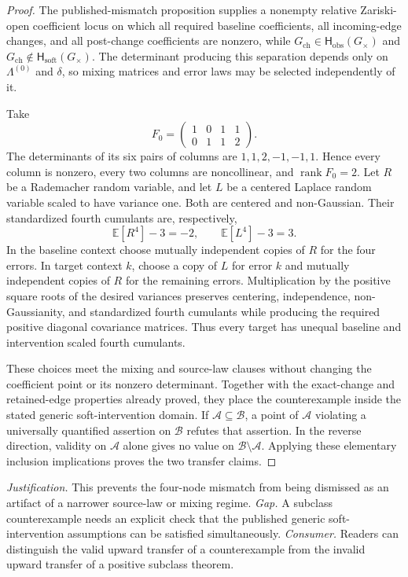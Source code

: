 \documentclass{article}
\begin{document}
\begin{proof}
The published-mismatch proposition supplies a nonempty relative Zariski-open coefficient locus on which all required baseline coefficients, all incoming-edge changes, and all post-change coefficients are nonzero, while \(G_{\mathrm{ch}}\in\mathsf H_{\mathrm{obs}}(G_\times)\) and \(G_{\mathrm{ch}}\notin\mathsf H_{\mathrm{soft}}(G_\times)\).  The determinant producing this separation depends only on \(\Lambda^{(0)}\) and \(\delta\), so mixing matrices and error laws may be selected independently of it.

Take
\[
 F_0=\begin{pmatrix}1&0&1&1\\0&1&1&2\end{pmatrix}.
\]
The determinants of its six pairs of columns are \(1,1,2,-1,-1,1\).  Hence every column is nonzero, every two columns are noncollinear, and \(\operatorname{rank}F_0=2\).  Let \(R\) be a Rademacher random variable, and let \(L\) be a centered Laplace random variable scaled to have variance one.  Both are centered and non-Gaussian.  Their standardized fourth cumulants are, respectively,
\[
 \mathbb E[R^4]-3=-2,
 \qquad
 \mathbb E[L^4]-3=3.
\]
In the baseline context choose mutually independent copies of \(R\) for the four errors.  In target context \(k\), choose a copy of \(L\) for error \(k\) and mutually independent copies of \(R\) for the remaining errors.  Multiplication by the positive square roots of the desired variances preserves centering, independence, non-Gaussianity, and standardized fourth cumulants while producing the required positive diagonal covariance matrices.  Thus every target has unequal baseline and intervention scaled fourth cumulants.

These choices meet the mixing and source-law clauses without changing the coefficient point or its nonzero determinant.  Together with the exact-change and retained-edge properties already proved, they place the counterexample inside the stated generic soft-intervention domain.  If \(\mathcal A\subseteq\mathcal B\), a point of \(\mathcal A\) violating a universally quantified assertion on \(\mathcal B\) refutes that assertion.  In the reverse direction, validity on \(\mathcal A\) alone gives no value on \(\mathcal B\setminus\mathcal A\).  Applying these elementary inclusion implications proves the two transfer claims.
\end{proof}
\par\smallskip\noindent \textit{Justification.} This prevents the four-node mismatch from being dismissed as an artifact of a narrower source-law or mixing regime. \textit{Gap.} A subclass counterexample needs an explicit check that the published generic soft-intervention assumptions can be satisfied simultaneously. \textit{Consumer.} Readers can distinguish the valid upward transfer of a counterexample from the invalid upward transfer of a positive subclass theorem.
\end{document}
